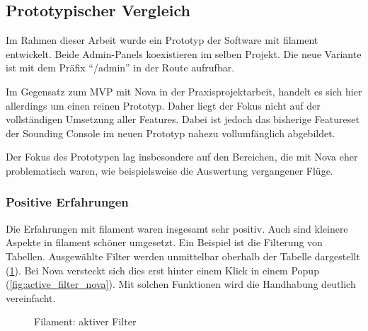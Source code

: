 \subsection{Prototypischer Vergleich}
Im Rahmen dieser Arbeit wurde ein Prototyp der Software mit filament entwickelt.
Beide Admin-Panels koexistieren im selben Projekt.
Die neue Variante ist mit dem Präfix \enquote{/admin} in der Route aufrufbar.

Im Gegensatz zum MVP mit Nova in der Praxisprojektarbeit, handelt es sich hier allerdings um einen reinen Prototyp.
Daher liegt der Fokus nicht auf der vollständigen Umsetzung aller Features.
Dabei ist jedoch das bisherige Featureset der Sounding Console im neuen Prototyp nahezu vollumfänglich abgebildet.

Der Fokus des Prototypen lag insbesondere auf den Bereichen, die mit Nova eher problematisch waren, wie beispielsweise die Auswertung vergangener Flüge.

\subsubsection{Positive Erfahrungen}
Die Erfahrungen mit filament waren insgesamt sehr positiv.
Auch sind kleinere Aspekte in filament schöner umgesetzt.
Ein Beispiel ist die Filterung von Tabellen.
Ausgewählte Filter werden unmittelbar oberhalb der Tabelle dargestellt (\ref{fig:active_filter_filament}).
Bei Nova versteckt sich dies erst hinter einem Klick in einem Popup (\ref{fig:active_filter_nova}).
Mit solchen Funktionen wird die Handhabung deutlich vereinfacht.

\color{lightgray}
\begin{figure}[h!]
    \centering
    \caption{Filament: aktiver Filter}
    \label{fig:active_filter_filament}
\end{figure}

